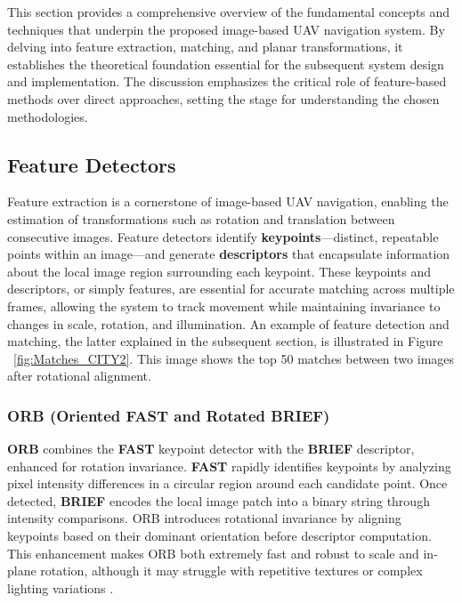 This section provides a comprehensive overview of the fundamental concepts and techniques that underpin the proposed image-based UAV navigation system. By delving into feature extraction, matching, and planar transformations, it establishes the theoretical foundation essential for the subsequent system design and implementation. The discussion emphasizes the critical role of feature-based methods over direct approaches, setting the stage for understanding the chosen methodologies.





\subsection{Feature Detectors}

Feature extraction is a cornerstone of image-based UAV navigation, enabling the estimation of transformations such as rotation and translation between consecutive images. Feature detectors identify \textbf{keypoints}—distinct, repeatable points within an image—and generate \textbf{descriptors} that encapsulate information about the local image region surrounding each keypoint. These keypoints and descriptors, or simply features, are essential for accurate matching across multiple frames, allowing the system to track movement while maintaining invariance to changes in scale, rotation, and illumination. An example of feature detection and matching, the latter explained in the subsequent section, is illustrated in Figure ~\ref{fig:Matches_CITY2}. This image shows the top 50 matches between two images after rotational alignment. 




\subsubsection{ORB (Oriented FAST and Rotated BRIEF)}

\textbf{ORB} combines the \textbf{FAST} \cite{trajkovic1998fast} keypoint detector with the \textbf{BRIEF} \cite{calonder2010brief} descriptor, enhanced for rotation invariance. \textbf{FAST} rapidly identifies keypoints by analyzing pixel intensity differences in a circular region around each candidate point. Once detected, \textbf{BRIEF} encodes the local image patch into a binary string through intensity comparisons. ORB introduces rotational invariance by aligning keypoints based on their dominant orientation before descriptor computation. This enhancement makes ORB both extremely fast and robust to scale and in-plane rotation, although it may struggle with repetitive textures or complex lighting variations \cite{tareen2018comparative}. 

